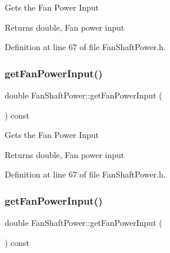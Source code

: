 Gets the Fan Power Input

\begin{DoxyReturn}{Returns}
double, Fan power input 
\end{DoxyReturn}


Definition at line 67 of file Fan\+Shaft\+Power.\+h.

\mbox{\label{class_fan_shaft_power_a6008dad9482c28d652c6075185d050e9}} 
\subsubsection{\texorpdfstring{get\+Fan\+Power\+Input()}{getFanPowerInput()}\hspace{0.1cm}{\footnotesize\ttfamily [2/3]}}
{\footnotesize\ttfamily double Fan\+Shaft\+Power\+::get\+Fan\+Power\+Input (\begin{DoxyParamCaption}{ }\end{DoxyParamCaption}) const\hspace{0.3cm}{\ttfamily [inline]}}

Gets the Fan Power Input

\begin{DoxyReturn}{Returns}
double, Fan power input 
\end{DoxyReturn}


Definition at line 67 of file Fan\+Shaft\+Power.\+h.

\mbox{\label{class_fan_shaft_power_a6008dad9482c28d652c6075185d050e9}} 
\subsubsection{\texorpdfstring{get\+Fan\+Power\+Input()}{getFanPowerInput()}\hspace{0.1cm}{\footnotesize\ttfamily [3/3]}}
{\footnotesize\ttfamily double Fan\+Shaft\+Power\+::get\+Fan\+Power\+Input (\begin{DoxyParamCaption}{ }\end{DoxyParamCaption}) const\hspace{0.3cm}{\ttfamily [inline]}}

